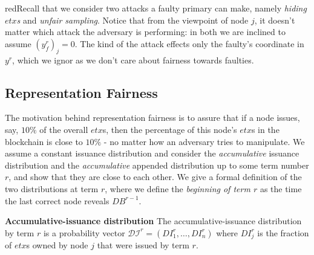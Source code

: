 red{Recall that we consider two attacks a faulty primary can make, namely \textit{hiding $etx$s} and \textit{unfair sampling}. Notice that from the viewpoint of node $j$, it doesn't matter which attack the adversary is performing: in both we are inclined to assume $(y_f^r)_j=0$. The kind of the attack effects only the faulty's coordinate in $y^r$, which we ignor as we don't care about fairness towards faulties.}

\subsection{Representation Fairness}\label{subsec:repfair}
The motivation behind representation fairness is to assure that if a node issues, say, $10\%$ of the overall $etx$s, then the percentage of this node's $etx$s in the blockchain is close to $10\%$ - no matter how an adversary tries to manipulate. 
We assume a constant issuance distribution and consider the \emph{accumulative} issuance distribution and the \emph{accumulative} appended distribution up to some term number $r$, and show that they are close to each other. We give a formal definition of the two distributions at term $r$, where we define the \emph{beginning of term $r$} as the time the last correct node reveals $DB^{r-1}$.
\begin{definition}{\textbf{Accumulative-issuance distribution}} \label{def:rep_iss} The accumulative-issuance distribution by term $r$ is a probability vector $\mathcal{DI}^r=(DI_1^r,\dots,DI_n^r)$ where $DI_j^r$ is the fraction of $etx$s owned by node $j$ that were issued by  term $r$. 
\end{definition}

